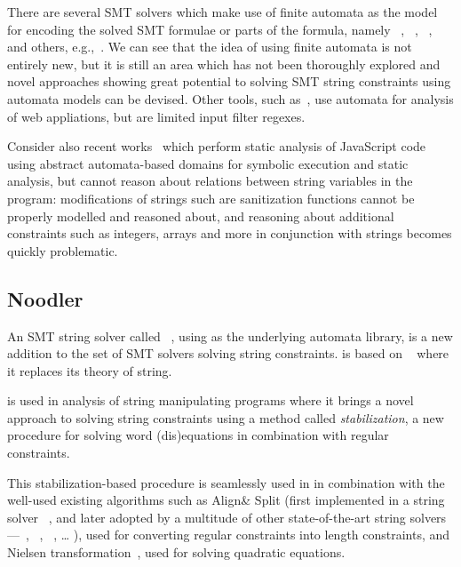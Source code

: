 There are several SMT solvers which make use of finite automata as the model for encoding the solved SMT formulae or parts of the formula, namely \ziiistriiire~\cite{Z3str3RE}, \trau~\cite{Trau}, \norn~\cite{Norn}, and others, e.g.,~\cite{AnthonyComplex2019}.
We can see that the idea of using finite automata is not entirely new, but it is still an area which has not been thoroughly explored and novel approaches showing great potential to solving SMT string constraints using automata models can be devised.
Other tools, such as~\cite{black_ostrich}, use automata for analysis of web appliations, but are limited input filter regexes.

Consider also recent works~\cite{tarsis24,MSAzure20} which perform static analysis of JavaScript code using abstract automata-based domains for symbolic execution and static analysis, but cannot reason about relations between string variables in the program: modifications of strings such are sanitization functions cannot be properly modelled and reasoned about, and reasoning about additional constraints such as integers, arrays and more in conjunction with strings becomes quickly problematic.

\subsection{Noodler}

An SMT string solver called \noodler~\cite{fm23_equations_synergy_regular_constraints_DBLP:conf/fm/BlahoudekCCHHLS23, oopsla23_stabilization_DBLP:journals/pacmpl/ChenCHHLS23,tacas24_noodler_10.1007/978-3-031-57246-3_2}, using \mata as the underlying automata library, is a new addition to the set of SMT solvers solving string constraints.
\noodler is based on \ziii~\cite{z3} where it replaces its theory of string.

\noodler is used in analysis of string manipulating programs where it brings a novel approach to solving string constraints using a method called \emph{stabilization}, a new procedure for solving word (dis)equations in combination with regular constraints.

This stabilization-based procedure is seamlessly used in \noodler in combination with the well-used existing algorithms such as
Align\& Split (first implemented in a string solver \norn~\cite{Norn,AutomataSplitting}, and later adopted by a multitude of other state-of-the-art string solvers---\ostrich~\cite{AnthonyTowards2016,AnthonyReplaceAll2018,AnthonyComplex2019,AnthonyRegex2022,AnthonyInteger2020},
\ziiistriiire~\cite{Z3str3RE,BerzishDGKMMN23}, \sloth~\cite{holik_string_2018}, \ldots
), used for converting regular constraints into length constraints, and
Nielsen transformation~\cite{nielsen1917}, used for solving quadratic equations.

